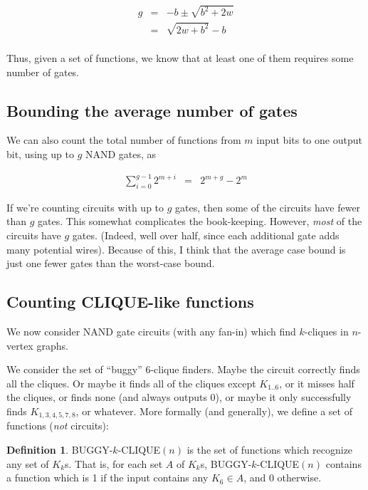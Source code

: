 \documentclass[12pt]{article}
\theoremstyle{definition}
\newtheorem{defn}{Definition}[section]
\begin{document}
\begin{eqnarray*}
g & = & -b \pm \sqrt{ b^2 + 2w} \\
  & = & {\sqrt {2w + b^2}} - b \\
\end{eqnarray*}

Thus, given a set of functions, we know that at least one of them requires
some number of gates.

\subsection{Bounding the average number of gates}

We can also count the total number of functions from $m$ input bits to one
output bit, using up to $g$ NAND gates, as

\begin{eqnarray*}
\sum_{i=0}^{g-1} 2^{m+i} & = & 2^{m+g} - 2^m
\end{eqnarray*}

If we're counting circuits with up to $g$ gates, then some of the circuits
have fewer than $g$ gates. This somewhat complicates the book-keeping.
However, {\em most} of the
circuits have $g$ gates. (Indeed, well over half, since each additional
gate adds many potential wires). Because of this, I think that the
average case bound is just one fewer gates than the worst-case bound.


\subsection{Counting CLIQUE-like functions}

We now consider NAND gate circuits (with any fan-in) which find $k$-cliques in $n$-vertex
graphs.

We consider the set of ``buggy'' 6-clique finders. 
Maybe the circuit correctly
finds all the cliques. Or maybe it finds all of the cliques except $K_{1..6}$,
or it misses half the cliques, or finds none (and always outputs 0), or maybe
it only successfully finds $K_{1,3,4,5,7,8}$, or whatever. More formally
(and generally),
we define a set of functions ({\em not} circuits):

\begin{defn}
\label{BUGGY-k-CLIQUE}
BUGGY-$k$-CLIQUE$(n)$ is the set of functions which recognize any set
of $K_k$s. That is, for each set $A$ of $K_k$s, BUGGY-$k$-CLIQUE$(n)$
contains a function which is 1 if the input contains any $K_6 \in A$,
and 0 otherwise.
\end{defn}
\end{document}
